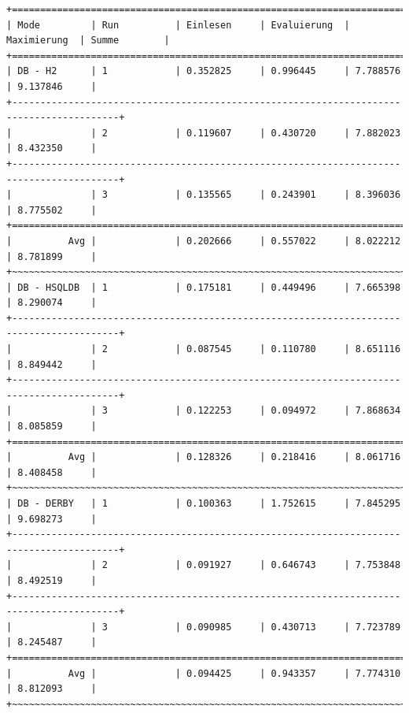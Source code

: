 \documentclass[draft,final]{vutinfth} %
\begin{document}
\begin{lstlisting}[float,basicstyle=\tiny,caption={Benchmark DB \textbf{mit} Indizes, Datei: lubm-ex-20-15.sparql.xml},label={lst:dbmi15}]
+=========================================================================================+
| Mode         | Run          | Einlesen     | Evaluierung  | Maximierung  | Summe        | 
+=========================================================================================+
| DB - H2      | 1            | 0.352825     | 0.996445     | 7.788576     | 9.137846     | 
+-----------------------------------------------------------------------------------------+
|              | 2            | 0.119607     | 0.430720     | 7.882023     | 8.432350     | 
+-----------------------------------------------------------------------------------------+
|              | 3            | 0.135565     | 0.243901     | 8.396036     | 8.775502     | 
+=========================================================================================+
|          Avg |              | 0.202666     | 0.557022     | 8.022212     | 8.781899     | 
+~~~~~~~~~~~~~~~~~~~~~~~~~~~~~~~~~~~~~~~~~~~~~~~~~~~~~~~~~~~~~~~~~~~~~~~~~~~~~~~~~~~~~~~~~+
| DB - HSQLDB  | 1            | 0.175181     | 0.449496     | 7.665398     | 8.290074     | 
+-----------------------------------------------------------------------------------------+
|              | 2            | 0.087545     | 0.110780     | 8.651116     | 8.849442     | 
+-----------------------------------------------------------------------------------------+
|              | 3            | 0.122253     | 0.094972     | 7.868634     | 8.085859     | 
+=========================================================================================+
|          Avg |              | 0.128326     | 0.218416     | 8.061716     | 8.408458     | 
+~~~~~~~~~~~~~~~~~~~~~~~~~~~~~~~~~~~~~~~~~~~~~~~~~~~~~~~~~~~~~~~~~~~~~~~~~~~~~~~~~~~~~~~~~+
| DB - DERBY   | 1            | 0.100363     | 1.752615     | 7.845295     | 9.698273     | 
+-----------------------------------------------------------------------------------------+
|              | 2            | 0.091927     | 0.646743     | 7.753848     | 8.492519     | 
+-----------------------------------------------------------------------------------------+
|              | 3            | 0.090985     | 0.430713     | 7.723789     | 8.245487     | 
+=========================================================================================+
|          Avg |              | 0.094425     | 0.943357     | 7.774310     | 8.812093     | 
+~~~~~~~~~~~~~~~~~~~~~~~~~~~~~~~~~~~~~~~~~~~~~~~~~~~~~~~~~~~~~~~~~~~~~~~~~~~~~~~~~~~~~~~~~+
\end{lstlisting}
\end{document}
